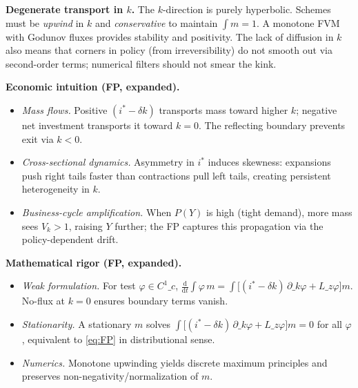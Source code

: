 ﻿\documentclass[11pt,letterpaper,oneside]{article}
\numberwithin{equation}{section}
\newcommand{\ac}[1]{{\mdseries\textsc{#1}}}
\newcommand{\1}{\mathbf{1}}
\newcommand{\Lz}{L\_z}
\begin{document}
\begin{tcolorbox}[mathstyle]
\textbf{Degenerate transport in $k$.} The $k$-direction is purely hyperbolic. Schemes must be \emph{upwind} in $k$ and \emph{conservative} to maintain $\int m=1$. A monotone \ac{FVM} with Godunov fluxes provides stability and positivity. The lack of diffusion in $k$ also means that corners in policy (from irreversibility) do not smooth out via second-order terms; numerical filters should not smear the kink.
\end{tcolorbox}

\begin{tcolorbox}[didacticstyle]
\textbf{Economic intuition (FP, expanded).}
\begin{itemize}[leftmargin=1.15em,itemsep=0.25em]
  \item \emph{Mass flows.} Positive $(i^*-\delta k)$ transports mass toward higher $k$; negative net investment transports it toward $k=0$. The reflecting boundary prevents exit via $k<0$.
  \item \emph{Cross-sectional dynamics.} Asymmetry in $i^*$ induces skewness: expansions push right tails faster than contractions pull left tails, creating persistent heterogeneity in $k$.
  \item \emph{Business-cycle amplification.} When $P(Y)$ is high (tight demand), more mass sees $V_k>1$, raising $Y$ further; the FP captures this propagation via the policy-dependent drift.
\end{itemize}
\end{tcolorbox}

\begin{tcolorbox}[mathstyle]
\textbf{Mathematical rigor (FP, expanded).}
\begin{itemize}[leftmargin=1.15em,itemsep=0.25em]
  \item \emph{Weak formulation.} For test $\varphi\in C^1\_c$, $\frac{\mathrm d}{\mathrm dt}\int \varphi\,m=\int \big[(i^*-\delta k)\,\partial\_k\varphi + \Lz\varphi\big] m$. No-flux at $k=0$ ensures boundary terms vanish.
  \item \emph{Stationarity.} A stationary $m$ solves $\int \big[(i^*-\delta k)\,\partial\_k\varphi + \Lz\varphi\big] m=0$ for all $\varphi$, equivalent to \eqref{eq:FP} in distributional sense.
  \item \emph{Numerics.} Monotone upwinding yields discrete maximum principles and preserves non-negativity/normalization of $m$.
\end{itemize}
\end{tcolorbox}
\end{document}
